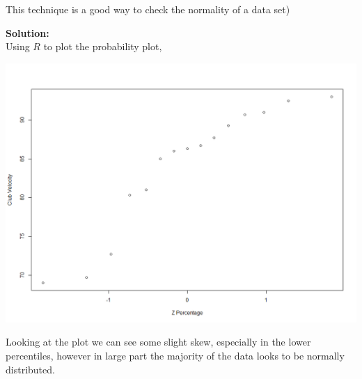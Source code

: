 \documentclass[12pt]{article}
\makeatletter
\theoremstyle{homework}
\newenvironment{exercise}[1]
{\def\@currentlabel{#1}\exercisecore}
{\endexercisecore}
\newcommand{\localhead}[1]{\par\smallskip\noindent\textbf{#1}\nobreak\\}%
\newcommand\solution{\localhead{Solution:}}
\makeatother
\begin{document}
\begin{exercise}{4.88} (This technique is a good way to check the normality of a data set)\\
  \solution Using $R$ to plot the probability plot,
\begin{center}
	\includegraphics[width = \textwidth]{Rplot.png}
\end{center}
Looking at the plot we can see some slight skew, especially in the lower percentiles, however in large part the majority of the data looks to be normally distributed. 
\end{exercise}
\vspace{.5in}
\end{document}
